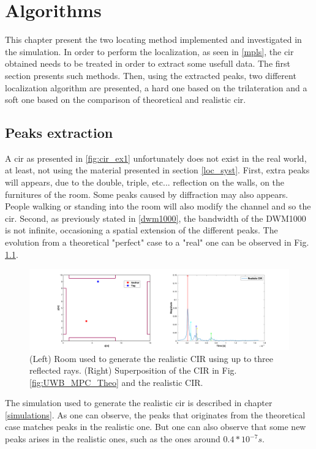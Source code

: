 \chapter{Algorithms}
\label{algos}

This chapter present the two locating method implemented and investigated in the simulation. In order to perform the localization, as seen in \ref{mpls}, the \gls{cir} obtained needs to be treated in order to extract some usefull data. The first section presents such methods. Then, using the extracted peaks, two different localization algorithm are presented, a hard one based on the trilateration and a soft one based on the comparison of theoretical and realistic \gls{cir}.

\section{Peaks extraction}

A \gls{cir} as presented in \ref{fig:cir_ex1} unfortunately does not exist in the real world, at least, not using the material presented in section \ref{loc_syst}. First, extra peaks will appears, due to the double, triple, etc...  reflection on the walls, on the furnitures of the room. Some peaks caused by diffraction may also appears. People walking or standing into the room will also modify the channel and so the \gls{cir}. Second, as previously stated in \ref{dwm1000}, the bandwidth of the DWM1000 is not infinite, occasioning a spatial extension of the different peaks. The evolution from a theoretical "perfect" case to a "real" one can be observed in Fig. \ref{fig:peaks_real}.

\begin{figure}[H]
\centering
\includegraphics[width=\linewidth]{Images/cir_theo_real.png}
\caption{(Left) Room used to generate the realistic CIR using up to three reflected rays. (Right) Superposition of the CIR in Fig. \ref{fig:UWB_MPC_Theo} and the realistic CIR. \label{fig:peaks_real}}
\end{figure}

The simulation used to generate the realistic \gls{cir} is described in chapter \ref{simulations}. As one can observe, the peaks that originates from the theoretical case matches peaks in the realistic one. But one can also observe that some new peaks arises in the realistic ones, such as the ones around $0.4*10^{-7}s$. 
\vspace{2mm}

